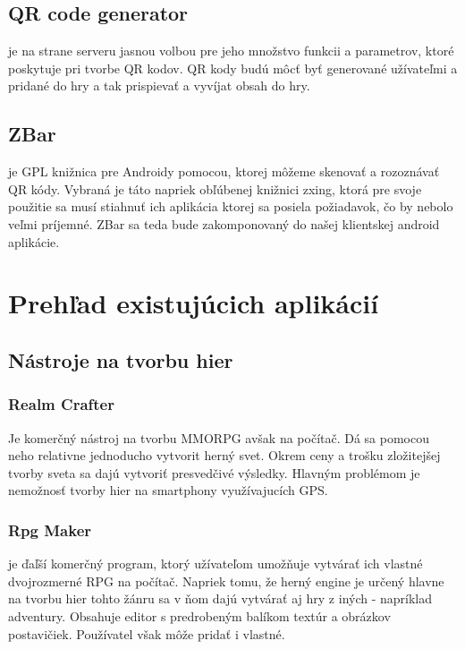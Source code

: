 
\subsection{QR code generator} je na strane serveru jasnou volbou pre jeho množstvo funkcii a parametrov\cite{qrgenerator-functions}, ktoré poskytuje pri tvorbe QR kodov. QR kody budú môcť byť generované užívateľmi a pridané do hry a tak prispievať a vyvíjat obsah do hry.



\subsection{ZBar} je GPL knižnica pre Androidy pomocou, ktorej môžeme skenovať a rozoznávať QR kódy. Vybraná je táto napriek obľúbenej knižnici zxing, ktorá pre svoje použitie sa musí stiahnuť ich aplikácia ktorej sa posiela požiadavok, čo by nebolo veľmi príjemné. ZBar sa teda bude zakomponovaný do našej klientskej android aplikácie\cite{qrreader}.




\section{Prehľad existujúcich aplikácií}

\subsection{Nástroje na tvorbu hier}

\subsubsection{Realm Crafter} Je komerčný nástroj na tvorbu MMORPG avšak na počítač. Dá sa pomocou neho relativne jednoducho vytvorit herný svet. Okrem ceny a trošku zložitejšej tvorby sveta sa dajú vytvoriť presvedčivé výsledky. Hlavným problémom je nemožnosť tvorby hier na smartphony využívajucích GPS.

\subsubsection{Rpg Maker} je ďaľší komerčný program, ktorý užívateľom umožňuje vytvárať ich vlastné dvojrozmerné RPG na počítač. Napriek tomu, že herný engine je určený hlavne na tvorbu hier tohto žánru sa v ňom dajú vytvárať aj hry z iných - napríklad adventury\cite{rpg-maker-game}. Obsahuje editor s predrobeným balíkom textúr a obrázkov postavičiek. Používatel však môže pridať i vlastné. 
\cite{rpg-maker}

